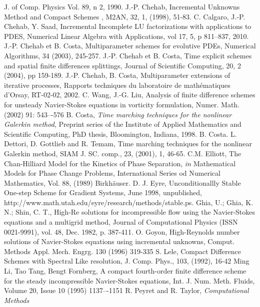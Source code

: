 \documentclass[11pt]{article}
\begin{document}
{\begin{thebibliography}{99}
J. of Comp. Physics Vol. 89, n 2, 1990.
 J.-P. Chehab, Incremental Unknowns Method and Compact Schemes , M2AN, 32, 1, (1998), 51-83.
 C. Calgaro, J.-P. Chehab, Y. Saad,
Incremental Incomplete LU factorizations with applications to PDES, Numerical Linear Algebra with Applications,
vol 17, 5, p 811--837, 2010.
  J.-P. Chehab et B. Costa, Multiparameter
schemes for evolutive PDEs, Numerical Algorithms, 34 (2003),
245-257.
  J.-P. Chehab et B. Costa,
Time explicit schemes and spatial finite differences splittings,
Journal of Scientific Computing, 20, 2 (2004), pp 159-189.
 J.-P. Chehab, B. Costa,
Multiparameter extensions of iterative processes, Rapports
techniques du laboratoire de math\'ematiques d'Orsay, RT-02-02,
2002.
 C. Wang, J.-G. Liu, Analysis of finite difference schemes for unsteady
Navier-Stokes equations in vorticity formulation, Numer. Math. (2002) 91: 543–-576
 B. Costa, {\it Time marching techniques for the
nonlinear Galerkin method}, Preprint series of the Institute of
Applied Mathematics and Scientific Computing, PhD thesis, 
Bloomington, Indiana, 1998.
 B. Costa. L. Dettori, D. Gottlieb and R. Temam,
Time marching techniques for the nonlinear Galerkin method, SIAM J.
SC. comp., 23, (2001), 1, 46-65.
 C.M. Elliott, The Chan-Hilliard Model for the Kinetics of Phase Separation, 
{\it in} Mathematical Models for Phase Change Problems, International Series od Numerical Mathematics, Vol. 88, (1989) Birkh\"auser.
 D. J. Eyre, Unconditionallly Stable One-step Scheme for Gradient Systems,
June 1998, unpublished, http://www.math.utah.edu/eyre/research/methods/stable.ps.
 Ghia, U.; Ghia, K. N.; Shin, C. T.,  High-Re solutions for incompressible flow using the Navier-Stokes equations and a multigrid method, Journal of Computational Physics (ISSN 0021-9991), vol. 48, Dec. 1982, p. 387-411.
O. Goyon, High-Reynolds number solutions of Navier-Stokes
equations using incremental unknowns, Comput. Methods Appl. Mech. Engrg. 130 (1996) 319-335
 S. Lele, Compact Difference Schemes with Spectral Like resolution,
J. Comp. Phys., 103, (1992), 16-42
 Ming Li,
Tao Tang, Bengt Fornberg, A compact fourth-order finite difference scheme for the steady incompressible Navier-Stokes equations, Int. J. Num. Meth. Fluids, Volume 20, Issue 10
(1995) 
1137–-1151
 R. Peyret and R. Taylor, {\it Computational Methods
}
\end{thebibliography}}
\end{document}
